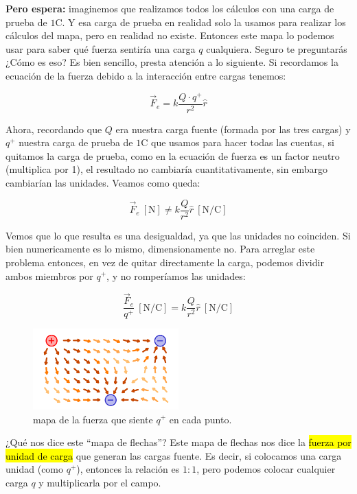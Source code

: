 \textbf{Pero espera:} imaginemos que realizamos todos los cálculos con una carga de prueba de \( 1 \si{\coulomb} \). Y esa carga de prueba en realidad solo la usamos para realizar los cálculos del mapa, pero en realidad no existe. Entonces este mapa lo podemos usar para saber qué fuerza sentiría una carga \( q \) cualquiera.
Seguro te preguntarás ¿Cómo es eso? Es bien sencillo, presta atención a lo siguiente. Si recordamos la ecuación de la fuerza debido a la interacción entre cargas tenemos:

\[
\vec{F}_e = k\frac{Q\cdot q^{+}}{r^2}\hat{r} 
\]

Ahora, recordando que \( Q \) era nuestra carga fuente (formada por las tres cargas) y \( q^{+} \) nuestra carga de prueba de \( 1 \si{\coulomb} \) que usamos para hacer todas las cuentas, si quitamos la carga de prueba, como en la ecuación de fuerza es un factor neutro (multiplica por 1), el resultado no cambiaría cuantitativamente, sin embargo cambiarían las unidades. Veamos como queda:

\[
\vec{F}_e ~ [\si{\newton}] \neq k \frac{Q}{r^2} \hat{r} ~ [\si{\newton\per\coulomb}]
\]

Vemos que lo que resulta es una desigualdad, ya que las unidades no coinciden. Si bien numericamente es lo mismo, dimensionamente no. Para arreglar este problema entonces, en vez de quitar directamente la carga, podemos dividir ambos miembros por \( q^{+} \), y no romperíamos las unidades:

\[
\frac{\vec{F}_e}{q^{+}} ~ [\si{\newton\per\coulomb}] = k \frac{Q}{r^2} \hat{r} ~ [\si{\newton\per\coulomb}]
\]

\begin{figure}[ht]
    \centering
    \includegraphics[width=0.5\textwidth]{images/field_example.png}
    \caption{mapa de la fuerza que siente \(q^{+}\) en cada punto.}
    \label{fig:campo_electrico_ejemplo_3}
\end{figure}

¿Qué nos dice este ``mapa de flechas''? Este mapa de flechas nos dice la \hl{fuerza por unidad de carga} que generan las cargas fuente. Es decir, si colocamos una carga unidad (como \(q^{+}\)), entonces la relación es \(1:1\), pero podemos colocar cualquier carga \(q\) y multiplicarla por el campo.


